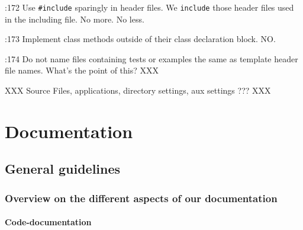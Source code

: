 \documentclass{book}
\newcommand{\name}[1]{\texttt{#1}}
\begin{document}
\cite{OKL_MisfeldtBumgardnerGray2004CppStyle}:172 Use \name{{\#}include} sparingly in header files. We \name{include} those header files used in the including file. No more. No less.

\cite{OKL_MisfeldtBumgardnerGray2004CppStyle}:173 Implement class methods outside of their class declaration block. NO.

\cite{OKL_MisfeldtBumgardnerGray2004CppStyle}:174 Do not name files containing tests or examples the same as template header file names. What's the point of this? XXX

XXX Source Files, applications, directory settings, aux settings ??? XXX


 
\part{Documentation}
\label{par:Documentation}

\chapter{General guidelines}
\label{cha:DocumentationGeneral}


\section{Overview on the different aspects of our documentation}
\label{sec:DocumentationOverview}

\subsection{Code-documentation}
\label{sec:DocumentationOverviewCode}
\end{document}
